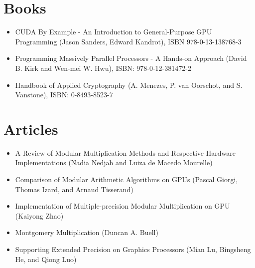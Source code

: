 \documentclass[12pt, a4paper]{report}
\begin{document}
\section{Books}
\begin{itemize}
\item CUDA By Example - An Introduction to General-Purpose GPU Programming
(Jason Sanders, Edward Kandrot), ISBN 978-0-13-138768-3
\item Programming Massively Parallel Processors - A Hands-on Approach (David B. Kirk and Wen-mei W. Hwu), ISBN: 978-0-12-381472-2
\item Handbook of Applied Cryptography (A. Menezes, P. van Oorschot, and S. Vanstone), ISBN: 0-8493-8523-7
\end{itemize}

\section{Articles}
\begin{itemize}
\item A Review of Modular Multiplication Methods and Respective Hardware Implementations (Nadia Nedjah and Luiza de Macedo Mourelle)
\item{Comparison of Modular Arithmetic Algorithms on GPUs (Pascal Giorgi, Thomas Izard, and Arnaud Tisserand)}
\item{Implementation of Multiple-precision Modular Multiplication on GPU (Kaiyong Zhao)}
\item{Montgomery Multiplication (Duncan A. Buell)}
\item{Supporting Extended Precision on Graphics Processors (Mian Lu, Bingsheng He, and Qiong Luo)}
\end{itemize}
\end{document}
